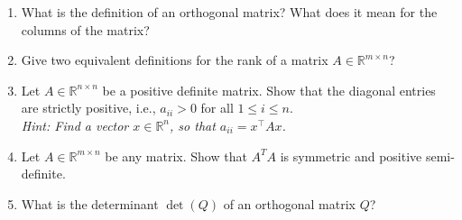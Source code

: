 \begin{enumerate}
\item What is the definition of an orthogonal matrix? What does it mean for the columns of the matrix?
\item Give two equivalent definitions for the rank of a matrix $A \in \mathbb{R}^{m \times n}$?
\item  Let $A \in \mathbb{R}^{n \times n}$ be a positive definite matrix. Show that the diagonal entries are strictly positive, i.e.,  $a_{ii} > 0$ for all $1\leq i\leq n$.\\
\textit{Hint: Find a vector $x\in\mathbb{R}^{n}$, so that $a_{ii}=x^\top A x$.}
\item Let $A \in  \mathbb{R}^{m \times n}$ be any matrix. Show that $A^TA$ is symmetric and positive semi-definite. 
\item What is the determinant $\det(Q)$ of an orthogonal matrix $Q$?


\end{enumerate}
 